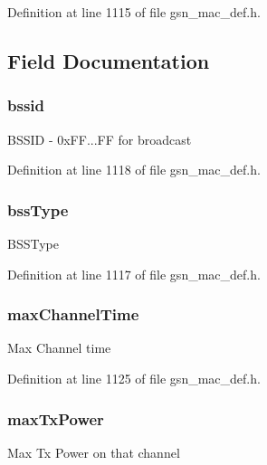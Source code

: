 Definition at line 1115 of file gsn\_\-mac\_\-def.h.



\subsection{Field Documentation}
\hypertarget{a00130_a0c8072b3bb52f68906a0aacd382de7c2}{
\subsubsection[{bssid}]{ {\bf bssid}}}
\label{a00130_a0c8072b3bb52f68906a0aacd382de7c2}
BSSID -\/ 0xFF...FF for broadcast 

Definition at line 1118 of file gsn\_\-mac\_\-def.h.

\hypertarget{a00130_a3bb46411ce5a127fcf6784f1644f0921}{
\subsubsection[{bssType}]{ {\bf bssType}}}
\label{a00130_a3bb46411ce5a127fcf6784f1644f0921}
BSSType 

Definition at line 1117 of file gsn\_\-mac\_\-def.h.

\hypertarget{a00130_ab2de5b015a5594a87829f4fb80f67fcf}{
\subsubsection[{maxChannelTime}]{ {\bf maxChannelTime}}}
\label{a00130_ab2de5b015a5594a87829f4fb80f67fcf}
Max Channel time 

Definition at line 1125 of file gsn\_\-mac\_\-def.h.

\hypertarget{a00130_a7cd081227ed796284bdbaf79788a39a5}{
\subsubsection[{maxTxPower}]{ {\bf maxTxPower}}}
\label{a00130_a7cd081227ed796284bdbaf79788a39a5}
Max Tx Power on that channel 

